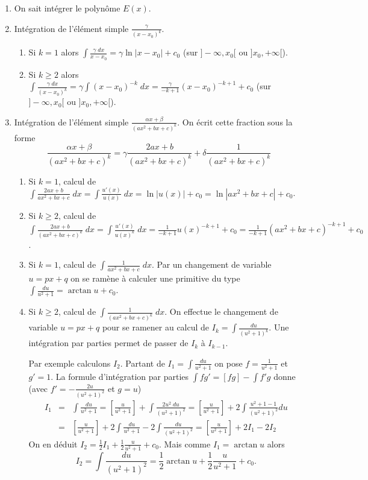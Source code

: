 \documentclass[class=report,crop=false]{standalone}
\begin{document}
\begin{enumerate}
  \item On sait intégrer le polynôme $E(x)$.

  \item Intégration de l'élément simple $\frac{\gamma}{(x - x_0)^k}$.
  \begin{enumerate}
     \item Si $k=1$ alors $\int \frac{\gamma \; dx}{x - x_0} = \gamma \ln|x - x_0|+c_0$
(sur $]-\infty,x_0[$ ou $]x_0,+\infty[$).
     \item Si $k\ge 2$ alors  $\int \frac{\gamma \; dx}{(x - x_0)^k} = \gamma \int (x - x_0)^{-k} \; dx
= \frac{\gamma}{-k+1}(x - x_0)^{-k+1}+c_0$ (sur $]-\infty,x_0[$ ou $]x_0,+\infty[$).
  \end{enumerate}

  \item Intégration de l'élément simple $\frac{\alpha x+\beta}{(a x^2+b x+c)^k}$.
On écrit cette fraction sous la forme
$$\frac{\alpha x+\beta}{(a x^2+b x+c)^k} = \gamma \frac{2a x+b}{(a x^2+b x+c)^k} + \delta \frac{1}{(a x^2+b x+c)^k}$$
  \begin{enumerate}
     \item Si $k=1$, calcul de $\int \frac{2a x+b}{a x^2+b x+c} \; dx = \int \frac{u'(x)}{u(x)} \; dx = \ln |u(x)| + c_0
= \ln |a x^2+b x+c|+c_0$.
     
     \item Si $k\ge 2$, calcul de $\int \frac{2a x+b}{(a x^2+b x+c)^k} \; dx = \int \frac{u'(x)}{u(x)^k} \; dx = \frac{1}{-k+1}u(x)^{-k+1}+c_0
= \frac{1}{-k+1}(a x^2+b x+c)^{-k+1}+c_0$.

     \item Si $k=1$, calcul de $\int \frac{1}{a x^2+b x+c}\; dx$. Par un changement de variable $u= px+q$ on se ramène à
calculer une primitive du type
$\int \frac{du}{u^2+1}=\arctan u + c_0$.

     \item Si $k\ge 2$, calcul de $\int \frac{1}{(a x^2+b x+c)^k} \; dx$. On effectue le changement de variable $u=px+q$
pour se ramener au calcul de $I_k =\int \frac{du}{(u^2+1)^k}$.
Une intégration par parties permet de passer de $I_k$ à $I_{k-1}$.

Par exemple calculons $I_2$. Partant de $I_1=\int \frac{du}{u^2+1}$ on pose
$f=\frac{1}{u^2+1}$ et $g'=1$. La formule d'intégration par parties $\int f g'=[f g]-\int f' g$ donne
(avec $f'=-\frac{2u}{(u^2+1)^2}$ et $g=u$)
\begin{eqnarray*}
I_1
  & = & \int \frac{du}{u^2+1} = \left[ \frac{u}{u^2+1} \right] + \int \frac{2u^2 \; du}{(u^2+1)^2}
        = \left[ \frac{u}{u^2+1} \right] + 2 \int  \frac{u^2+1 - 1}{(u^2+1)^2}du \\
 & = & \left[ \frac{u}{u^2+1} \right] + 2 \int \frac{du}{u^2+1} - 2 \int \frac{du}{(u^2+1)^2}
    = \left[ \frac{u}{u^2+1} \right] + 2I_1 - 2I_2
\end{eqnarray*}
On en déduit
$I_2 = \frac12 I_1 + \frac12\frac{u}{u^2+1} + c_0$.
Mais comme $I_1=\arctan u$ alors
$$I_2 = \int \frac{du}{(u^2+1)^2} =  \frac12 \arctan u + \frac12\frac{u}{u^2+1} + c_0.$$
  \end{enumerate}
\end{enumerate}
\end{document}
